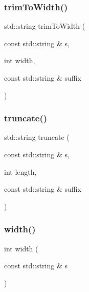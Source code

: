 \subsubsection{\texorpdfstring{trim\+To\+Width()}{trimToWidth()}}
{\footnotesize\ttfamily std\+::string trim\+To\+Width (\begin{DoxyParamCaption}\item[{const std\+::string \&}]{s,  }\item[{int}]{width,  }\item[{const std\+::string \&}]{suffix }\end{DoxyParamCaption})}

\mbox{\label{namespacestringutils_a1550a8086086257a927e0e95e34486f5}} 
\subsubsection{\texorpdfstring{truncate()}{truncate()}}
{\footnotesize\ttfamily std\+::string truncate (\begin{DoxyParamCaption}\item[{const std\+::string \&}]{s,  }\item[{int}]{length,  }\item[{const std\+::string \&}]{suffix }\end{DoxyParamCaption})}

\mbox{\label{namespacestringutils_a24e5e1105ba0113729cd02019020cae9}} 
\subsubsection{\texorpdfstring{width()}{width()}}
{\footnotesize\ttfamily int width (\begin{DoxyParamCaption}\item[{const std\+::string \&}]{s }\end{DoxyParamCaption})}

